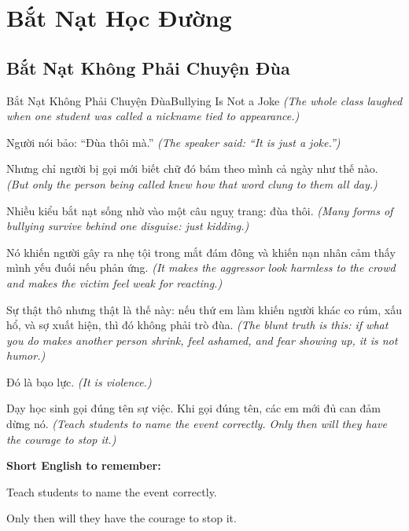 \chapter{Bắt Nạt Học Đường}

\section{Bắt Nạt Không Phải Chuyện Đùa}
\begin{truyen}{Bắt Nạt Không Phải Chuyện Đùa}{Bullying Is Not a Joke}
\textit{(The whole class laughed when one student was called a nickname tied to appearance.)}

Người nói bảo: ``Đùa thôi mà.''
\textit{(The speaker said: ``It is just a joke.'')}

Nhưng chỉ người bị gọi mới biết chữ đó bám theo mình cả ngày như thế nào.
\textit{(But only the person being called knew how that word clung to them all day.)}

Nhiều kiểu bắt nạt sống nhờ vào một câu nguỵ trang: đùa thôi.
\textit{(Many forms of bullying survive behind one disguise: just kidding.)}

Nó khiến người gây ra nhẹ tội trong mắt đám đông và khiến nạn nhân cảm thấy mình yếu đuối nếu phản ứng.
\textit{(It makes the aggressor look harmless to the crowd and makes the victim feel weak for reacting.)}

Sự thật thô nhưng thật là thế này: nếu thứ em làm khiến người khác co rúm, xấu hổ, và sợ xuất hiện, thì đó không phải trò đùa.
\textit{(The blunt truth is this: if what you do makes another person shrink, feel ashamed, and fear showing up, it is not humor.)}

Đó là bạo lực.
\textit{(It is violence.)}

\end{truyen}

\begin{baihoc}
Dạy học sinh gọi đúng tên sự việc. Khi gọi đúng tên, các em mới đủ can đảm dừng nó.
\textit{(Teach students to name the event correctly. Only then will they have the courage to stop it.)}
\end{baihoc}

\begin{ghinhoanh}
\textbf{Short English to remember:}

Teach students to name the event correctly.

Only then will they have the courage to stop it.

\end{ghinhoanh}

